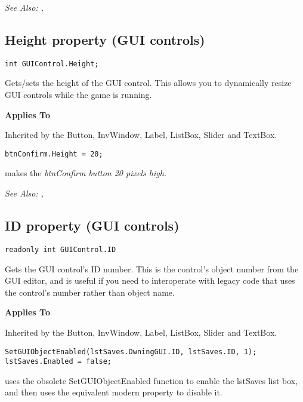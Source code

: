 \it{See Also:} ,


\subsection{Height property (GUI controls)}\label{GUIControl.Height}%

\begin{verbatim}
int GUIControl.Height;
\end{verbatim}
Gets/sets the height of the GUI control.  This allows you to dynamically
resize GUI controls while the game is running.

\bf{Applies To}

Inherited by the Button, InvWindow, Label, ListBox, Slider and TextBox.

\begin{verbatim}
btnConfirm.Height = 20;
\end{verbatim}
makes the \it{btnConfirm} button 20 pixels high.

\it{See Also:} ,


\subsection{ID property (GUI controls)}\label{GUIControl.ID}%

\begin{verbatim}
readonly int GUIControl.ID
\end{verbatim}
Gets the GUI control's ID number. This is the control's object number from the GUI editor,
and is useful if you need to interoperate with legacy code that uses the control's number
rather than object name.

\bf{Applies To}

Inherited by the Button, InvWindow, Label, ListBox, Slider and TextBox.

\begin{verbatim}
SetGUIObjectEnabled(lstSaves.OwningGUI.ID, lstSaves.ID, 1);
lstSaves.Enabled = false;
\end{verbatim}
uses the obsolete SetGUIObjectEnabled function to enable the lstSaves list box,
and then uses the equivalent modern property to disable it.

